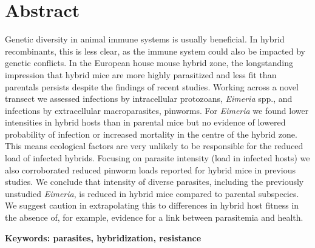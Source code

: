 \section{Abstract}
Genetic diversity in animal immune systems is usually beneficial. In hybrid recombinants, this is less clear, as the immune system could also be impacted by genetic conflicts. In the European house mouse hybrid zone, the longstanding impression that hybrid mice are more highly parasitized and less fit than parentals persists despite the findings of recent studies. Working across a novel transect we assessed infections by intracellular protozoans, \textit{Eimeria} spp., and infections by extracellular macroparasites, pinworms. For \textit{Eimeria} we found lower intensities in hybrid hosts than in parental mice but no evidence of lowered probability of infection or increased mortality in the centre of the hybrid zone. This means ecological factors are very unlikely to be responsible for the reduced load of infected hybrids. Focusing on parasite intensity (load in infected hosts) we also corroborated reduced pinworm loads reported for hybrid mice in previous studies. We conclude that intensity of diverse parasites, including the previously unstudied \textit{Eimeria}, is reduced in hybrid mice compared to parental subspecies. We suggest caution in extrapolating this to differences in hybrid host fitness in the absence of, for example, evidence for a link between parasitemia and health.

\textbf{Keywords: parasites, hybridization, resistance}

